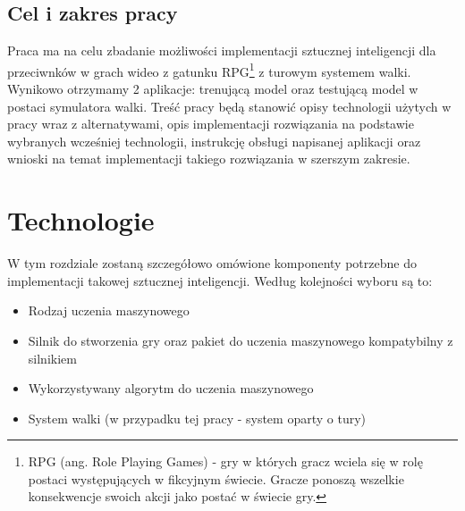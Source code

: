 \documentclass{SGGW-thesis}
\begin{document}
\section{Cel i zakres pracy}
Praca ma na celu zbadanie możliwości implementacji sztucznej inteligencji dla przeciwnków w grach wideo z gatunku RPG\footnote{RPG (ang. Role Playing Games) 
- gry w których gracz wciela się w rolę postaci występujących w fikcyjnym świecie. Gracze ponoszą wszelkie konsekwencje swoich akcji jako postać w świecie gry.}
z turowym systemem walki. Wynikowo otrzymamy 2 aplikacje: trenującą model oraz testującą model w postaci symulatora walki. Treść pracy będą stanowić opisy technologii
użytych w pracy wraz z alternatywami, opis implementacji rozwiązania na podstawie wybranych wcześniej technologii, instrukcję obsługi napisanej aplikacji oraz
wnioski na temat implementacji takiego rozwiązania w szerszym zakresie.


\chapter{Technologie}
W tym rozdziale zostaną szczegółowo omówione komponenty potrzebne do implementacji takowej sztucznej inteligencji. Według kolejności wyboru są to: 
\begin{itemize}
  \item{Rodzaj uczenia maszynowego}
  \item{Silnik do stworzenia gry oraz pakiet do uczenia maszynowego kompatybilny z silnikiem}
  \item{Wykorzystywany algorytm do uczenia maszynowego}
  \item{System walki (w przypadku tej pracy - system oparty o tury)}
\end{itemize}
\end{document}
